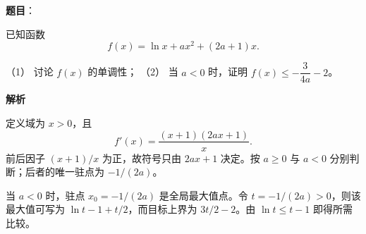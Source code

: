 \begin{answer}

\textbf{题目}：

已知函数
\nopagebreak[4]
\[
f(x)=\ln x+ax^2+(2a+1)x.
\]

（1） 讨论 \(f(x)\) 的单调性；
（2） 当 \(a<0\) 时，证明 \(f(x)\leq-\dfrac{3}{4a}-2\)。

\textbf{解析}


定义域为 \(x>0\)，且
\nopagebreak[4]
\[
f'(x)=\frac{(x+1)(2ax+1)}x.
\]
前后因子 \((x+1)/x\) 为正，故符号只由 \(2ax+1\) 决定。按 \(a\ge0\) 与 \(a<0\) 分别判断；后者的唯一驻点为 \(-1/(2a)\)。


当 \(a<0\) 时，驻点 \(x_0=-1/(2a)\) 是全局最大值点。令 \(t=-1/(2a)>0\)，则该最大值可写为 \(\ln t-1+t/2\)，而目标上界为 \(3t/2-2\)。由 \(\ln t\le t-1\) 即得所需比较。



\end{answer}
